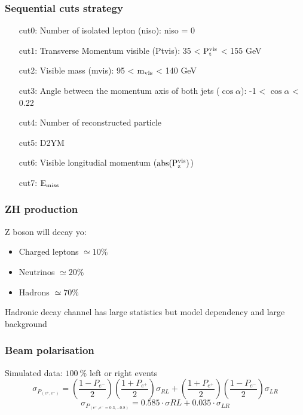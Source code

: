 \documentclass{beamer}
\begin{document}
  \begin{frame}[plain,label=cuts]
  \frametitle{Sequential cuts strategy}
      \begin{enumerate}
          \item [cut0:] Number of isolated lepton (niso): niso = 0 %
          \item [cut1:] Transverse Momentum visible (Ptvis): 35 < $\rm{P_{t}^{vis}}$ < 155 GeV
          \item [cut2:] Visible mass (mvis): 95 < $\rm{m_{vis}}$ < 140 GeV
          \item [cut3:] Angle between the momentum axis of both jets ($\cos{\alpha}$): -1 < $\cos{\alpha}$ < 0.22
          \item [cut4:] Number of reconstructed particle 
          \item [cut5:] D2YM
          \item [cut6:] Visible longitudial momentum ($\rm{abs(P_{z}^{vis})}$)
          \item [cut7:] $\rm{E_{miss}}$
      \end{enumerate}
  \end{frame}


  \begin{frame}[plain]
    \frametitle{ZH production}

    Z boson will decay yo:
    \begin{itemize}
        \item Charged leptons $\simeq 10 \%$
        \item Neutrinos $\simeq 20 \%$
        \item Hadrons $\simeq 70\%$
    \end{itemize}

    Hadronic decay channel has large statistics but model dependency and large background
  \end{frame}




  \begin{frame}[plain]
    \frametitle{Beam polarisation}

    \begin{block}{Simulated data: $100~\%$ left or right events}
      \footnotesize{
      \[ \sigma_{P_{(e^+,e^-)}} = \left( \frac{1-P_{e^-}}{2} \right) \left( \frac{1+P_{e^+}}{2} \right) \sigma_{RL} + \left( \frac{1+P_{e^+}}{2} \right) \left( \frac{1-P_{e^-}}{2} \right) \sigma_{LR} \]
      \[ \sigma_{P_{(e^+,e^- = 0.3, -0.8)}} = 0.585 \cdot \sigma{RL} + 0.035 \cdot \sigma_{LR} \]
      }
    \end{block}
  \end{frame}
\end{document}
